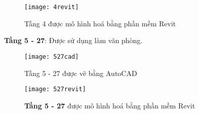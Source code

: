 \begin{figure}[H]
	\centering
	\texttt{[image: 4revit]}
	\caption{Tầng 4 được mô hình hoá bằng phần mềm Revit}
	\label{4revit}
\end{figure} 

\newpage
\textbf{Tầng 5 - 27}: Được sử dụng làm văn phòng.

\begin{figure}[H]
	\centering
	\texttt{[image: 527cad]}
	\caption{Tầng 5 - 27 được vẽ bằng AutoCAD}
	\label{527cad}
\end{figure}

\begin{figure}[H]
	\centering
	\texttt{[image: 527revit]}
	\caption{\textbf{Tầng 5 - 27} được mô hình hoá bằng phần mềm Revit}
	\label{527revit}
\end{figure}